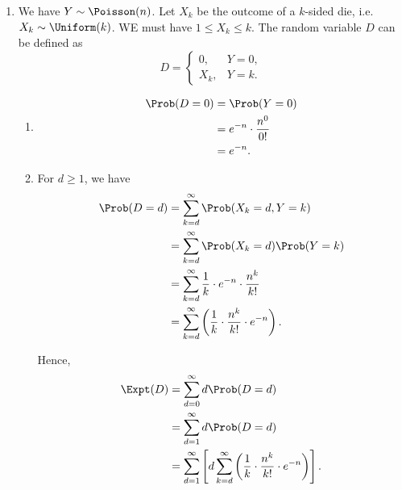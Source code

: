 \begin{enumerate}
    \item We have \(Y \sim \Poisson(n)\). Let \(X_k\) be the outcome of a \(k\)-sided die, i.e. \(X_k \sim \Uniform(k)\). WE must have \(1 \leq X_k \leq k\). The random variable \(D\) can be defined as
          \[
              D = \begin{cases}
                  0,   & Y = 0, \\
                  X_k, & Y = k.
              \end{cases}
          \]

          \begin{enumerate}
              \item \begin{align*}
                        \Prob(D = 0) & = \Prob(Y = 0)                \\
                                     & = e^{-n} \cdot \frac{n^0}{0!} \\
                                     & = e^{-n}.
                    \end{align*}

              \item For \(d \geq 1\), we have
                    \begin{align*}
                        \Prob(D = d) & = \sum_{k = d}^{\infty} \Prob(X_k = d, Y = k)                                       \\
                                     & = \sum_{k = d}^{\infty} \Prob(X_k = d) \Prob(Y = k)                                 \\
                                     & = \sum_{k = d}^{\infty} \frac{1}{k} \cdot e^{-n} \cdot \frac{n^k}{k!}               \\
                                     & = \sum_{k = d}^{\infty} \left(\frac{1}{k} \cdot \frac{n^k}{k!} \cdot e^{-n}\right).
                    \end{align*}

                    Hence,
                    \begin{align*}
                        \Expt(D) & = \sum_{d = 0}^{\infty} d \Prob(D = d)                                                                                   \\
                                 & = \sum_{d = 1}^{\infty} d \Prob(D = d)                                                                                   \\
                                 & = \sum_{d = 1}^{\infty} \left[d \sum_{k = d}^{\infty} \left(\frac{1}{k} \cdot \frac{n^k}{k!} \cdot e^{-n}\right)\right].
                    \end{align*}


\end{enumerate}
\end{enumerate}
